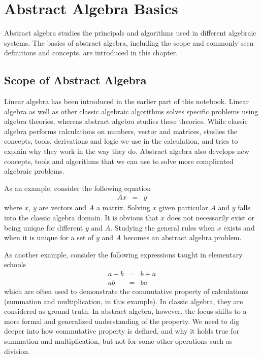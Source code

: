 \chapter{Abstract Algebra Basics}

Abstract algebra studies the principals and algorithms used in different algebraic systems. The basics of abstract algebra, including the scope and commonly seen definitions and concepts, are introduced in this chapter.

\section{Scope of Abstract Algebra}

Linear algebra has been introduced in the earlier part of this notebook. Linear algebra as well as other classic algebraic algorithms solves specific problems using algebra theories, whereas abstract algebra studies these theories. While classic algebra performs calculations on numbers, vector and matrices,  studies the concepts, tools, derivations and logic we use in the calculation, and tries to explain why they work in the way they do. Abstract algebra also develops new concepts, tools and algorithms that we can use to solve more complicated algebraic problems.

As an example, consider the following equation
\begin{eqnarray}
	Ax &=& y \nonumber
\end{eqnarray}
where $x$, $y$ are vectors and $A$ a matrix. Solving $x$ given particular $A$ and $y$ falls into the classic algebra domain. It is obvious that $x$ does not necessarily exist or being unique for different $y$ and $A$. Studying the general rules when $x$ exists and when it is unique for a set of $y$ and $A$ becomes an abstract algebra problem.

As another example, consider the following expressions taught in elementary schools
\begin{eqnarray}
	a+b &=& b+a \nonumber \\
	ab &=& ba \nonumber
\end{eqnarray}
which are often used to demonstrate the commutative property of calculations (summation and multiplication, in this example). In classic algebra, they are considered as ground truth. In abstract algebra, however, the focus shifts to a more formal and generalized understanding of the property. We need to dig deeper into how commutative property is defined, and why it holds true for summation and multiplication, but not for some other operations such as division.

